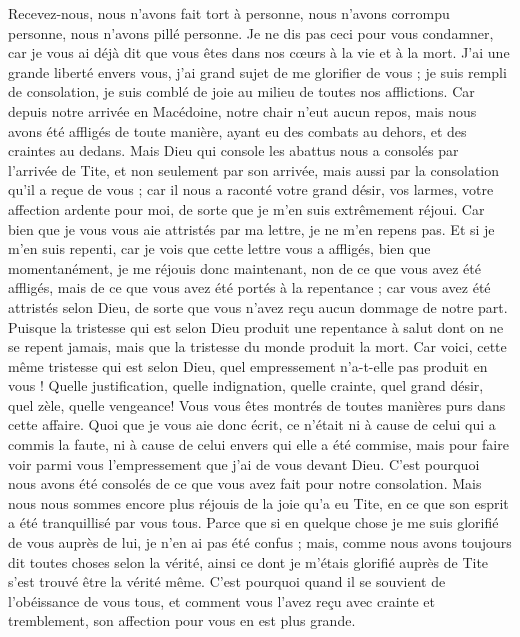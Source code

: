 \begin{multicols}{2}
Recevez-nous, nous n'avons fait tort à personne, nous n'avons corrompu personne, nous n'avons pillé personne.
Je ne dis pas ceci pour vous condamner, car je vous ai déjà dit que vous êtes dans nos cœurs à la vie et à la mort.
J'ai une grande liberté envers vous, j'ai grand sujet de me glorifier de vous ; je suis rempli de consolation, je suis comblé de joie au milieu de toutes nos afflictions.
Car depuis notre arrivée en Macédoine, notre chair n’eut aucun repos, mais nous avons été affligés de toute manière, ayant eu des combats au dehors, et des craintes au dedans.
Mais Dieu qui console les abattus nous a consolés par l’arrivée de Tite,
et non seulement par son arrivée, mais aussi par la consolation qu'il a reçue de vous ; car il nous a raconté votre grand désir, vos larmes, votre affection ardente pour moi, de sorte que je m'en suis extrêmement réjoui.
Car bien que je vous vous aie attristés par ma lettre, je ne m'en repens pas. Et si je m'en suis repenti, car je vois que cette lettre vous a affligés, bien que momentanément,
je me réjouis donc maintenant, non de ce que vous avez été affligés, mais de ce que vous avez été portés à la repentance ; car vous avez été attristés selon Dieu, de sorte que vous n'avez reçu aucun dommage de notre part.
Puisque la tristesse qui est selon Dieu produit une repentance à salut dont on ne se repent jamais, mais que la tristesse du monde produit la mort.
Car voici, cette même tristesse qui est selon Dieu, quel empressement n’a-t-elle pas produit en vous ! Quelle justification, quelle indignation, quelle crainte, quel grand désir, quel zèle, quelle vengeance! Vous vous êtes montrés de toutes manières purs dans cette affaire.
Quoi que je vous aie donc écrit, ce n'était ni à cause de celui qui a commis la faute, ni à cause de celui envers qui elle a été commise, mais pour faire voir parmi vous l'empressement que j'ai de vous devant Dieu.
C'est pourquoi nous avons été consolés de ce que vous avez fait pour notre consolation. Mais nous nous sommes encore plus réjouis de la joie qu'a eu Tite, en ce que son esprit a été tranquillisé par vous tous.
Parce que si en quelque chose je me suis glorifié de vous auprès de lui, je n’en ai pas été confus ; mais, comme nous avons toujours dit toutes choses selon la vérité, ainsi ce dont je m'étais glorifié auprès de Tite s’est trouvé être la vérité même.
C'est pourquoi quand il se souvient de l'obéissance de vous tous, et comment vous l'avez reçu avec crainte et tremblement, son affection pour vous en est plus grande.

\end{multicols}
